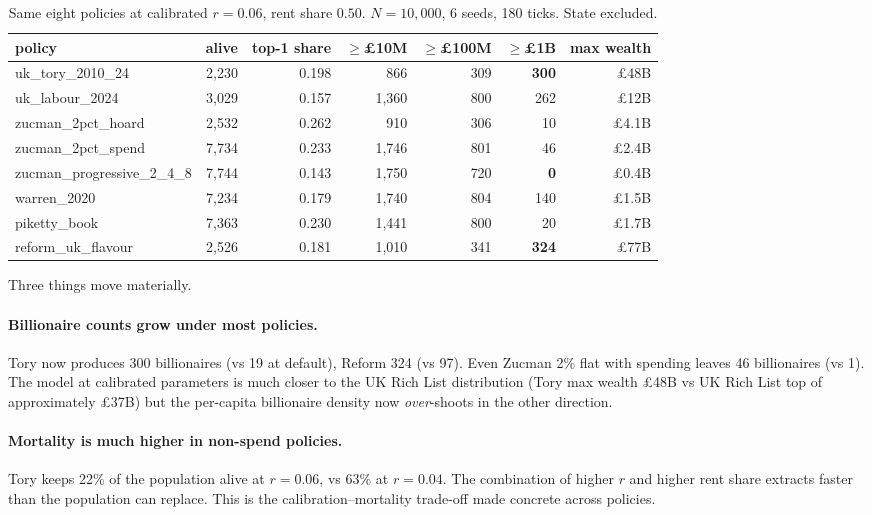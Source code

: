 \documentclass[11pt]{article}
\begin{document}
\begin{table}[t]
\centering
\small
\caption{Same eight policies at calibrated $r = 0.06$, rent share
$0.50$.  $N = 10{,}000$, 6 seeds, 180 ticks.  State excluded.}
\label{tab:policies-calibrated}
\begin{tabular}{lrrrrrr}
\toprule
policy & alive & top-1 share & $\geq$\pounds10M & $\geq$\pounds100M & $\geq$\pounds1B & max wealth \\
\midrule
uk\_tory\_2010\_24            & 2{,}230 & 0.198 & 866 & 309 & \textbf{300} & \pounds48B \\
uk\_labour\_2024              & 3{,}029 & 0.157 & 1{,}360 & 800 & 262 & \pounds12B \\
zucman\_2pct\_hoard           & 2{,}532 & 0.262 & 910 & 306 & 10 & \pounds4.1B \\
zucman\_2pct\_spend           & 7{,}734 & 0.233 & 1{,}746 & 801 & 46 & \pounds2.4B \\
zucman\_progressive\_2\_4\_8  & 7{,}744 & 0.143 & 1{,}750 & 720 & \textbf{0} & \pounds0.4B \\
warren\_2020                  & 7{,}234 & 0.179 & 1{,}740 & 804 & 140 & \pounds1.5B \\
piketty\_book                 & 7{,}363 & 0.230 & 1{,}441 & 800 & 20 & \pounds1.7B \\
reform\_uk\_flavour           & 2{,}526 & 0.181 & 1{,}010 & 341 & \textbf{324} & \pounds77B \\
\bottomrule
\end{tabular}
\end{table}

Three things move materially.

\paragraph{Billionaire counts grow under most policies.}  Tory now
produces 300 billionaires (vs 19 at default), Reform 324 (vs 97).
Even Zucman 2\% flat with spending leaves 46 billionaires (vs 1).
The model at calibrated parameters is much closer to the UK Rich
List distribution (Tory max wealth \pounds 48B vs UK Rich List top
of approximately \pounds 37B) but the per-capita billionaire density
now \emph{over}-shoots in the other direction.

\paragraph{Mortality is much higher in non-spend policies.}  Tory
keeps 22\% of the population alive at $r = 0.06$, vs 63\% at
$r = 0.04$.  The combination of higher $r$ and higher rent share
extracts faster than the population can replace.  This is the
calibration--mortality trade-off made concrete across policies.
\end{document}
